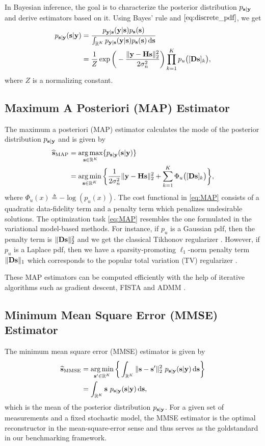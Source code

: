 \documentclass[journal]{IEEEtran}
\begin{document}
In Bayesian inference, the goal is to characterize the posterior distribution $p_{{\bf{s}}|{\bf{y}}}$ and derive estimators based on it. Using Bayes' rule and $\eqref{eq:discrete_pdf}$, we get
\begin{align}\label{eq:posterior}
    p_{{\bf{s}}|{\bf{y}}}({\bf{s}} | {\bf{y}}) &= \frac{p_{{\bf{y}}|{\bf{s}}}({\bf{y}} | {\bf{s}}) p_{{\bf{s}}}({\bf{s}})}{\int_{\mathbb{R}^K} p_{{\bf{y}}|{\bf{s}}}({\bf{y}} | {\bf{s}}) p_{{\bf{s}}}({\bf{s}}) \,\mathrm{d} {\bf{s}}}  \nonumber \\
    &= \frac{1}{Z} \exp\bigg(-\frac{\|{\bf{y}} - {\bf{H}} {\bf{s}}\|_{2}^{2}}{2 \sigma_{n}^{2}}\bigg) \prod_{k = 1}^{K} p_{u}\big([{\bf{D}} {\bf{s}}]_k\big),
\end{align}
where $Z$ is a normalizing constant.

\subsection{Maximum A Posteriori (MAP) Estimator}
The maximum a posteriori (MAP) estimator calculates the mode of the posterior distribution $p_{{\bf{s}}| {\bf{y}}}$ and is given by 
\begin{align} \label{eq:MAP}
    \widehat{{\bf{s}}}_{\text{MAP}} &= \operatorname*{arg\,max}_{{\bf{s}} \in \mathbb{R}^K} \{p_{{\bf{s}} | {\bf{y}}}({\bf{s}} | {\bf{y}})\} \nonumber \\
&= \operatorname*{arg\,min}_{{\bf{s}} \in \mathbb{R}^K} \bigg\{\frac{1}{2 \sigma_{n}^{2}} \|{\bf{y}} - {\bf{H}} {\bf{s}}\|_{2}^{2} + \sum_{k=1}^{K} \Phi_{u} \big([{\bf{D}} {\bf{s}}]_k \big) \bigg\},
\end{align}
where $\Phi_u(x) \triangleq -\log(p_u(x))$. The cost functional in \eqref{eq:MAP} consists of a quadratic data-fidelity term and a penalty term which penalizes undesirable solutions. The optimization task \eqref{eq:MAP} resembles the one formulated in the variational model-based methods. For instance, if $p_u$ is a Gaussian pdf, then the penalty term is $\|{\bf{D}} {\bf{s}}\|_{2}^{2}$ and we get the classical Tikhonov regularizer \cite{tikhonov1963}. However, if $p_u$ is a Laplace pdf, then we have a sparsity-promoting $\ell_1$-norm penalty term $\|{\bf{D}} {\bf{s}}\|_{1}$ which corresponds to the popular total variation (TV) regularizer \cite{rudin1992nonlinear}.

These MAP estimators can be computed efficiently with the help of iterative algorithms such as gradient descent, FISTA \cite{beck2009fast} and ADMM \cite{boyd2011distributed}.


\subsection{Minimum Mean Square Error (MMSE) Estimator}
The minimum mean square error (MMSE) estimator is given by
\begin{align}\label{eq:MMSE}
    \widehat{{\bf{s}}}_{\text{MMSE}} &= \operatorname*{arg\,min}_{{{\bf{s}}'} \in \mathbb{R}^K} \bigg\{\int_{\mathbb{R}^K} \|{\bf{s}} - {\bf{s}}'\|_{2}^{2} \ p_{{\bf{s}}|{\bf{y}}}({\bf{s}} | {\bf{y}}) \,\mathrm{d} {\bf{s}} \bigg\} \nonumber \\
&= \int_{\mathbb{R}^K} {\bf{s}} \ p_{{\bf{s}}|{\bf{y}}}({\bf{s}} | {\bf{y}}) \,\mathrm{d} {\bf{s}},
\end{align}
which is the mean of the posterior distribution $p_{{\bf{s}}|{\bf{y}}}$. For a given set of measurements and a fixed stochastic model, the MMSE estimator is the optimal reconstructor in the mean-square-error sense and thus serves as the goldstandard in our benchmarking framework.
\end{document}
